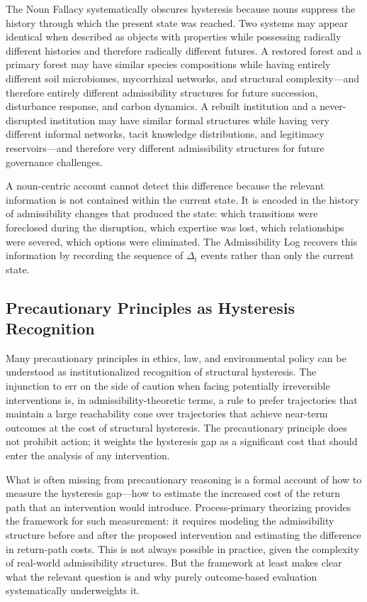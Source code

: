 \documentclass[12pt, a4paper]{article}
\theoremstyle{plain}
\theoremstyle{definition}
\theoremstyle{remark}
\begin{document}
The Noun Fallacy systematically obscures hysteresis because nouns suppress
the history through which the present state was reached. Two systems may
appear identical when described as objects with properties while possessing
radically different histories and therefore radically different futures. A
restored forest and a primary forest may have similar species compositions
while having entirely different soil microbiomes, mycorrhizal networks,
and structural complexity---and therefore entirely different admissibility
structures for future succession, disturbance response, and carbon dynamics.
A rebuilt institution and a never-disrupted institution may have similar
formal structures while having very different informal networks, tacit
knowledge distributions, and legitimacy reservoirs---and therefore very
different admissibility structures for future governance challenges.

A noun-centric account cannot detect this difference because the relevant
information is not contained within the current state. It is encoded in
the history of admissibility changes that produced the state: which
transitions were foreclosed during the disruption, which expertise was
lost, which relationships were severed, which options were eliminated.
The Admissibility Log recovers this information by recording the sequence
of $\Delta_t$ events rather than only the current state.

\subsection{Precautionary Principles as Hysteresis Recognition}

Many precautionary principles in ethics, law, and environmental policy
can be understood as institutionalized recognition of structural hysteresis.
The injunction to err on the side of caution when facing potentially
irreversible interventions is, in admissibility-theoretic terms, a rule
to prefer trajectories that maintain a large reachability cone over
trajectories that achieve near-term outcomes at the cost of structural
hysteresis. The precautionary principle does not prohibit action; it
weights the hysteresis gap as a significant cost that should enter the
analysis of any intervention.

What is often missing from precautionary reasoning is a formal account of
how to measure the hysteresis gap---how to estimate the increased cost of
the return path that an intervention would introduce. Process-primary theorizing
provides the framework for such measurement: it requires modeling the
admissibility structure before and after the proposed intervention and
estimating the difference in return-path costs. This is not always possible
in practice, given the complexity of real-world admissibility structures.
But the framework at least makes clear what the relevant question is and
why purely outcome-based evaluation systematically underweights it.
\end{document}
